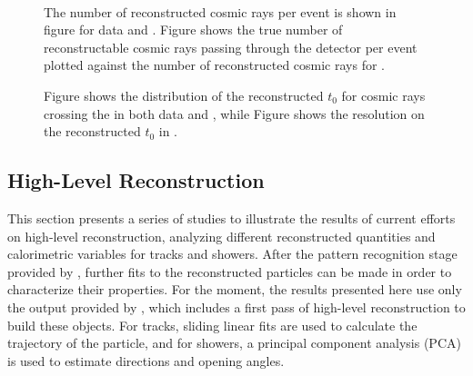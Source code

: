 \begin{figure}[!ht]
\centering
{}
 \\
\caption[Reconstructed cosmic rays per event for data and ]{The number of reconstructed cosmic rays per event is shown in figure \protect{} for data and .  Figure \protect{} shows the true number of reconstructable cosmic rays passing through the detector per event plotted against the number of reconstructed cosmic rays for .}
\label{fig:pandora_protodune_cr_number}
\end{figure}

\begin{figure}[!ht]
\centering
{}
\caption[Distribution of reconstructed $t_{0}$ for cosmic rays]{Figure \protect{} shows the distribution of the reconstructed $t_{0}$ for cosmic rays crossing the  in both data and , while Figure \protect{} shows the resolution on the reconstructed $t_{0}$ in .}
\label{fig:pandora_protodune_cr_t0}
\end{figure}


\subsection{High-Level Reconstruction}
\label{sec:Pandora:High}

This section presents a series of studies to illustrate the results of current efforts on high-level reconstruction, analyzing different reconstructed quantities and calorimetric variables for tracks and showers. After the pattern recognition stage provided by , further fits to the reconstructed \threed particles can be made in order to characterize their properties. For the moment, the results presented here use only the output provided by , which includes a first pass of high-level reconstruction to build these objects. For tracks,  sliding linear fits are used to calculate the trajectory of the particle, and for showers, a principal component analysis (PCA) is used to estimate directions and opening angles. 

